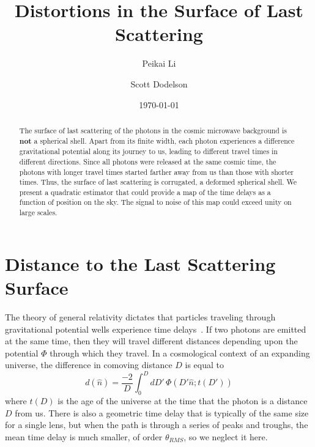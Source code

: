 \documentclass[prl,amsmath,amssymb,floatfix,superscriptaddress,nofootinbib,twocolumn]{revtex4-1}
\def\be{\begin{equation}}
\def\ee{\end{equation}}
\begin{document}
\title{Distortions in the Surface of Last Scattering}


\author{\large Peikai Li}
\author{\large Scott Dodelson}

\date{\today}

\begin{abstract}
The surface of last scattering of the photons in the cosmic microwave background is {\bf not} a spherical shell. Apart from its finite width, each photon experiences a difference gravitational potential along its journey to us, leading to different travel times in different directions. Since all photons were released at the same cosmic time, the photons with longer travel times started farther away from us than those with shorter times. Thus, the surface of last scattering is corrugated, a deformed spherical shell. We present a quadratic estimator that could provide a map of the time delays as a function of position on the sky. The signal to noise of this map could exceed unity on large scales.
\end{abstract}

\maketitle

\section{Distance to the Last Scattering Surface}

The theory of general relativity dictates that particles traveling through gravitational potential wells experience time delays~\cite{1964PhRvL..13..789S}. If two photons are emitted at the same time, then they will travel different distances depending upon the potential $\Phi$ through which they travel. In a cosmological context of an expanding universe, the difference in comoving distance $D$ is equal to  
\be
d(\hat n) = \frac{-2}{D} \int_0^D dD'\, \Phi\left(D'\hat n; t(D')\right)
\ee
where $t(D)$ is the age of the universe at the time that the photon is a distance $D$ from us. There is also a geometric time delay that is typically of the same size for a single lens, but when the path is through a series of peaks and troughs, the mean time delay is much smaller, of order $\theta_{RMS}$, so we neglect it here. 
\end{document}
